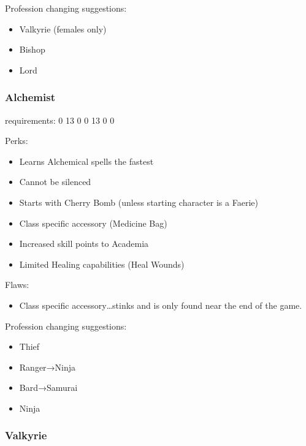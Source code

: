 \documentclass[12pt]{article}
\providecommand{\tightlist}{%
  \setlength{\itemsep}{0pt}\setlength{\parskip}{0pt}}
\newcommand{\indexSpell}[1]{\index{#1}}
\newcommand{\spell}[1]{#1\indexSpell{#1}}
\newcommand{\WviiTwoColumnSetup}{\raggedcolumns\RaggedRight}
\begin{document}
Profession changing suggestions:

\begin{itemize}
\item
  Valkyrie (females only)
\item
  Bishop
\item
  Lord
\end{itemize}

\subsubsection{Alchemist}\label{alchemist}

requirements: 0 13 0 0 13 0 0

\begin{multicols}{2}\WviiTwoColumnSetup
Perks:

\begin{itemize}
\item
  Learns Alchemical spells the fastest
\item
  Cannot be silenced
\item
  Starts with Cherry Bomb (unless starting character is a Faerie)
\item
  Class specific accessory (Medicine Bag)
\item
  Increased skill points to Academia
\item
  Limited Healing capabilities (\spell{Heal Wounds})
\end{itemize}
\columnbreak

Flaws:

\begin{itemize}
\tightlist
\item
  Class specific accessory\ldots{}stinks and is only found near the end
  of the game.
\end{itemize}
\end{multicols}

Profession changing suggestions:

\begin{itemize}
\item
  Thief
\item
  Ranger→Ninja
\item
  Bard→Samurai
\item
  Ninja
\end{itemize}

\subsubsection{Valkyrie}\label{valkyrie}
\end{document}
